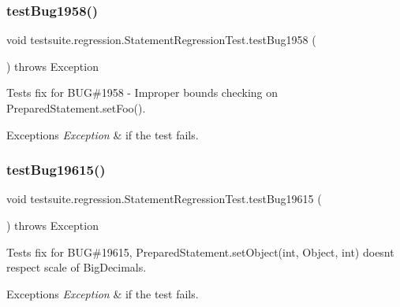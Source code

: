 \subsubsection{\texorpdfstring{test\+Bug1958()}{testBug1958()}}
{\footnotesize\ttfamily void testsuite.\+regression.\+Statement\+Regression\+Test.\+test\+Bug1958 (\begin{DoxyParamCaption}{ }\end{DoxyParamCaption}) throws Exception}

Tests fix for B\+UG\#1958 -\/ Improper bounds checking on Prepared\+Statement.\+set\+Foo().


\begin{DoxyExceptions}{Exceptions}
{\em Exception} & if the test fails. \\
\hline
\end{DoxyExceptions}
\mbox{\label{classtestsuite_1_1regression_1_1_statement_regression_test_a8b65f0d094f2bb8f3e1fc9d4181c956c}} 
\subsubsection{\texorpdfstring{test\+Bug19615()}{testBug19615()}}
{\footnotesize\ttfamily void testsuite.\+regression.\+Statement\+Regression\+Test.\+test\+Bug19615 (\begin{DoxyParamCaption}{ }\end{DoxyParamCaption}) throws Exception}

Tests fix for B\+UG\#19615, Prepared\+Statement.\+set\+Object(int, Object, int) doesn\textquotesingle{}t respect scale of Big\+Decimals.


\begin{DoxyExceptions}{Exceptions}
{\em Exception} & if the test fails. \\
\hline
\end{DoxyExceptions}
\mbox{\label{classtestsuite_1_1regression_1_1_statement_regression_test_abe26694e3066526cd5be755352de286b}} 
